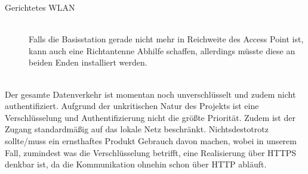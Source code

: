 \begin{description}
\begin{description}
			\item [Gerichtetes WLAN] \hfill \\
				Falls die Basisstation gerade nicht mehr in Reichweite des Access Point ist, kann auch eine Richtantenne Abhilfe schaffen, allerdings müsste diese an beiden Enden installiert werden.
		\end{description}
	\item [Verschlüsselung] \hfill \\
		Der gesamte Datenverkehr ist momentan noch unverschlüsselt und zudem nicht authentifiziert. Aufgrund der unkritischen Natur des Projekts ist eine Verschlüsselung und Authentifizierung nicht die größte Priorität. Zudem ist der Zugang standardmäßig auf das lokale Netz beschränkt. Nichtsdestotrotz sollte/muss ein ernsthaftes Produkt Gebrauch davon machen, wobei in unserem Fall, zumindest was die Verschlüsselung betrifft, eine Realisierung über HTTPS denkbar ist, da die Kommunikation ohnehin schon über HTTP abläuft.
	\item
\end{description}
